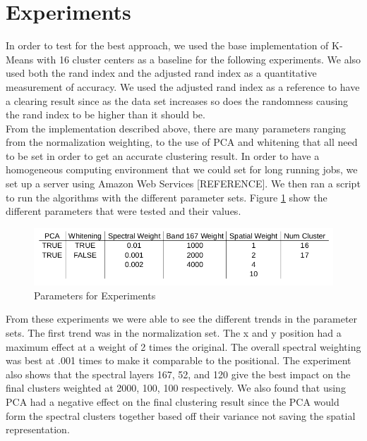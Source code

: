 \documentclass[journal]{IEEEtran}
\begin{document}
\section{Experiments}
  In order to test for the best approach, we used the base implementation of K-Means with 16 cluster centers as a baseline for the following experiments. We also used both the rand index and the adjusted rand index as a quantitative measurement of accuracy. We used the adjusted rand index as a reference to have a clearing result since as the data set increases so does the randomness causing the rand index to be higher than it should be.\\

  From the implementation described above, there are many parameters ranging from the normalization weighting, to the use of PCA and whitening that all need to be set in order to get an accurate clustering result. In order to have a homogeneous computing environment that we could set for long running jobs, we set up a server using Amazon Web Services [REFERENCE]. We then ran a script to run the algorithms with the different parameter sets. Figure \ref{fig:Parameters} show the different parameters that were tested and their values.\\

  \begin{figure}[h!]
    \centering\includegraphics[width=\columnwidth]{images/parameters.png}
    \caption{Parameters for Experiments}
    \label{fig:Parameters}
  \end{figure}

  From these experiments we were able to see the different trends in the parameter sets. The first trend was in the normalization set. The x and y position had a maximum effect at a weight of 2 times the original. The overall spectral weighting was best at .001 times to make it comparable to the positional. The experiment also shows that the spectral layers 167, 52, and 120 give the best impact on the final clusters weighted at 2000, 100, 100 respectively. We also found that using PCA had a negative effect on the final clustering result since the PCA would form the spectral clusters together based off their variance not saving the spatial representation.\\
\end{document}
